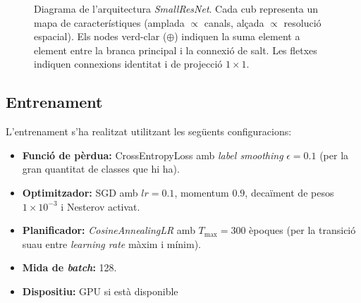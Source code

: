 \documentclass[9pt,a4paper,twoside]{tau-class/tau}
\newcommand{\fmap}[5]{%
    \def\fw{#2/30}%
    \def\fh{#3/10}%
    \def\fd{#3/30}%
    \def\fblx{#1}%
    \def\fbly{3.2/2 - \fh/2 - \fd/2}%
  \fill[#4!62!black]
    (\fblx+\fw,     \fbly)                      --
    (\fblx+\fw+\fd, \fbly+\fd)                  --
    (\fblx+\fw+\fd, \fbly+\fd+\fh)              --
    (\fblx+\fw,     \fbly+\fh)                  -- cycle;
  \fill[#4!52!white]
    (\fblx,         \fbly+\fh)                  --
    (\fblx+\fw,     \fbly+\fh)                  --
    (\fblx+\fw+\fd, \fbly+\fh+\fd)              --
    (\fblx+\fd,     \fbly+\fh+\fd)              -- cycle;
  \fill[#4]
    (\fblx,   \fbly)   -- (\fblx+\fw, \fbly)    --
    (\fblx+\fw,\fbly+\fh) -- (\fblx,  \fbly+\fh) -- cycle;
  \draw[black!48, line width=0.28pt]
    (\fblx,\fbly) -- (\fblx+\fw,\fbly) --
    (\fblx+\fw,\fbly+\fh) -- (\fblx,\fbly+\fh) -- cycle;
  \draw[black!48, line width=0.28pt]
    (\fblx+\fw,\fbly) -- (\fblx+\fw+\fd,\fbly+\fd) --
    (\fblx+\fw+\fd,\fbly+\fd+\fh) -- (\fblx+\fw,\fbly+\fh) -- cycle;
  \draw[black!48, line width=0.28pt]
    (\fblx,\fbly+\fh) -- (\fblx+\fw,\fbly+\fh) --
    (\fblx+\fw+\fd,\fbly+\fh+\fd) -- (\fblx+\fd,\fbly+\fh+\fd) -- cycle;
  \node[font=\fontsize{5.5}{6}\selectfont, inner sep=0.8pt, below]
    at (\fblx+\fw/2, \fbly) {#2};
  \node[font=\fontsize{5.5}{6}\selectfont, inner sep=0.8pt, below, yslant=1]
    at (\fblx+\fw+\fd/2, \fbly+\fd/2+\fh*0.9) {#3$\times$#3};
  \coordinate (#5-back)  at (\fblx,           \fbly+\fh/2+\fd/2);
  \coordinate (#5-front) at (\fblx+\fw+\fd/2, \fbly+\fh/2+\fd/2);
}
\newcommand{\fmapFC}[5]{%
    \def\fw{#2/30}%
    \def\fh{1/10}%
    \def\fd{#3/30}%
    \def\fblx{#1}%
    \def\fbly{3.2/2 - \fh/2 - \fd/2}%
  \fill[#4!62!black]
    (\fblx+\fw,\fbly)              -- (\fblx+\fw+\fd,\fbly+\fd)         --
    (\fblx+\fw+\fd,\fbly+\fd+\fh) -- (\fblx+\fw,\fbly+\fh)             -- cycle;
  \fill[#4!52!white]
    (\fblx,\fbly+\fh)              -- (\fblx+\fw,\fbly+\fh)             --
    (\fblx+\fw+\fd,\fbly+\fh+\fd) -- (\fblx+\fd,\fbly+\fh+\fd)         -- cycle;
  \fill[#4]
    (\fblx,\fbly) -- (\fblx+\fw,\fbly) --
    (\fblx+\fw,\fbly+\fh) -- (\fblx,\fbly+\fh) -- cycle;
  \draw[black!48, line width=0.28pt]
    (\fblx,\fbly) -- (\fblx+\fw,\fbly) --
    (\fblx+\fw,\fbly+\fh) -- (\fblx,\fbly+\fh) -- cycle;
  \draw[black!48, line width=0.28pt]
    (\fblx+\fw,\fbly) -- (\fblx+\fw+\fd,\fbly+\fd) --
    (\fblx+\fw+\fd,\fbly+\fd+\fh) -- (\fblx+\fw,\fbly+\fh) -- cycle;
  \draw[black!48, line width=0.28pt]
    (\fblx,\fbly+\fh) -- (\fblx+\fw,\fbly+\fh) --
    (\fblx+\fw+\fd,\fbly+\fh+\fd) -- (\fblx+\fd,\fbly+\fh+\fd) -- cycle;
  \node[font=\fontsize{5.5}{6}\selectfont, inner sep=0.8pt, below]
    at (\fblx+\fw/2, \fbly) {#2};
  \node[font=\fontsize{5.5}{6}\selectfont, inner sep=0.8pt, below, yslant=1]
    at (\fblx+\fw+\fd/2, \fbly+\fd/2+\fh*0.9) {#3};
  \coordinate (#5-back)  at (\fblx+\fd/2,       \fbly+\fh/2+\fd/2);
  \coordinate (#5-front) at (\fblx+\fw+\fd/2,   \fbly+\fh/2+\fd/2);
}
\newcommand{\addnode}[3]{%
  \filldraw[fill=Cadd!82, draw=black!55, line width=0.45pt]
    (#1,#2) circle (0.185);
  \draw[white, line width=1.15pt]
    (#1-0.12,#2) -- (#1+0.12,#2)
    (#1,#2-0.12) -- (#1,#2+0.12);
  \coordinate (#3) at (#1, #2);
}
\begin{document}
\begin{figure}[ht]
        \caption{Diagrama de l'arquitectura \textit{SmallResNet}. Cada cub representa un mapa de característiques (amplada $\propto$ canals, alçada $\propto$ resolució espacial). Els nodes verd-clar ($\oplus$) indiquen la suma element a element entre la branca principal i la connexió de salt. Les fletxes indiquen connexions identitat i de projecció $1{\times}1$.}
        \label{fig:arch}
        \end{figure}

    \subsection{Entrenament}

        L'entrenament s'ha realitzat utilitzant les següents configuracions:
        
        \begin{itemize}
            \item \textbf{Funció de pèrdua:} CrossEntropyLoss amb \textit{label smoothing} $\epsilon = 0.1$ (per la gran quantitat de classes que hi ha).
            \item \textbf{Optimitzador:} SGD amb $lr=0.1$, momentum $0.9$, decaïment de pesos $1{\times}10^{-3}$ i Nesterov activat.
            \item \textbf{Planificador:} \textit{CosineAnnealingLR} amb $T_{\max}=300$ èpoques (per la transició suau entre \textit{learning rate} màxim i mínim).
            \item \textbf{Mida de \textit{batch}:} 128.
            \item \textbf{Dispositiu:} GPU si està disponible
        \end{itemize}
        
\end{document}
